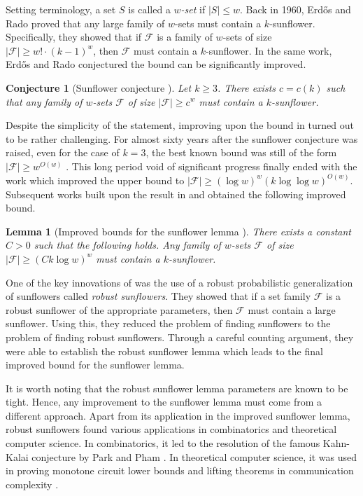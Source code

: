 \documentclass{article}
\newtheorem{lemma}[lemma]{Lemma}
\newtheorem{conjecture}[conjecture]{Conjecture}
\newcommand{\<}{\langle}
\renewcommand{\>}{\rangle}
\newcommand{\calF}{\mathcal{F}}
\begin{document}
Setting terminology, a set $S$ is called a \emph{$w$-set} if $|S| \leq w$. Back in 1960, Erd\H{o}s and Rado \cite{ER60} proved that any large family of $w$-sets must contain a $k$-sunflower. Specifically, they showed that if $\calF$ is a family of $w$-sets of size $|\calF| \geq w! \cdot (k-1)^w$, then $\calF$ must contain a $k$-sunflower. In the same work, Erd\H{o}s and Rado \cite{ER60} conjectured the bound can be significantly improved.

\begin{conjecture}[Sunflower conjecture \cite{ER60}] Let $k \geq 3$. There exists $c = c(k)$ such that any family of $w$-sets $\calF$ of size $|\calF| \geq c^w$ must contain a $k$-sunflower.
\end{conjecture}

Despite the simplicity of the statement, improving upon the bound in \cite{ER60} turned out to be rather challenging. For almost sixty years after the sunflower conjecture was raised, even for the case of $k = 3$, the best known bound was still of the form $|\calF| \geq w^{O(w)}$ \cite{Kos97, Fuk18}. This long period void of significant progress finally ended with the work \cite{ALWZ21} which  improved the upper bound to $|\calF| \geq (\log w)^w (k \log \log w)^{O(w)}$. Subsequent works \cite{Rao20, BCW21} built upon the result in \cite{ALWZ21} and obtained the following improved bound. 


\begin{lemma}[Improved bounds for the sunflower lemma \cite{BCW21}] 
There exists a constant $C > 0$ such that the following holds. Any family of $w$-sets $\calF$ of size $|\calF| \geq (Ck \log w)^w$ must contain a $k$-sunflower.
\end{lemma}

One of the key innovations of \cite{ALWZ21} was the use of a robust probabilistic generalization of sunflowers called \emph{robust sunflowers}. They showed that if a set family $\calF$ is a robust sunflower of the appropriate parameters, then $\calF$ must contain a large sunflower. Using this, they reduced the problem of finding sunflowers to the problem of finding robust sunflowers. Through a careful counting argument, they were able to establish the robust sunflower lemma which leads to the final improved bound for the sunflower lemma. 

It is worth noting that the robust sunflower lemma parameters are known to be tight. Hence, any improvement to the sunflower lemma must come from a different approach. Apart from its application in the improved sunflower lemma, robust sunflowers found various applications in combinatorics and theoretical computer science. In combinatorics, it led to the resolution of the famous Kahn-Kalai conjecture \cite{KK07} by Park and Pham \cite{PP24}. In theoretical computer science, it was used in proving monotone circuit lower bounds \cite{Ros14, CKR22} and lifting theorems in communication complexity \cite{LMM+22}.
\end{document}
